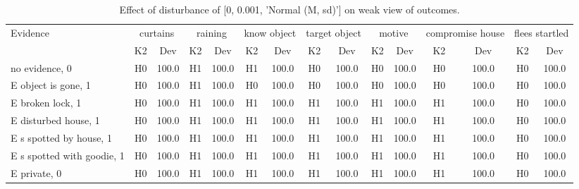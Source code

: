 \begin{table}\begin{tabular}{l|cc|cc|cc|cc|cc|cc|cc}\toprule\multirow{2}{*}{Evidence} & \multicolumn{2}{c}{curtains}& \multicolumn{2}{c}{raining}& \multicolumn{2}{c}{know object}& \multicolumn{2}{c}{target object}& \multicolumn{2}{c}{motive}& \multicolumn{2}{c}{compromise house}& \multicolumn{2}{c}{flees startled}\\& {K2} & {Dev}& {K2} & {Dev}& {K2} & {Dev}& {K2} & {Dev}& {K2} & {Dev}& {K2} & {Dev}& {K2} & {Dev}\\\midrule
no evidence, 0 & H0&100.0&H1&100.0&H1&100.0&H0&100.0&H0&100.0&H0&100.0&H0&100.0\\E object is gone, 1 & H0&100.0&H1&100.0&H0&100.0&H0&100.0&H0&100.0&H0&100.0&H0&100.0\\E broken lock, 1 & H0&100.0&H1&100.0&H1&100.0&H1&100.0&H1&100.0&H1&100.0&H0&100.0\\E disturbed house, 1 & H0&100.0&H1&100.0&H1&100.0&H1&100.0&H1&100.0&H1&100.0&H0&100.0\\E s spotted by house, 1 & H0&100.0&H1&100.0&H1&100.0&H1&100.0&H1&100.0&H1&100.0&H0&100.0\\E s spotted with goodie, 1 & H0&100.0&H1&100.0&H1&100.0&H1&100.0&H1&100.0&H1&100.0&H0&100.0\\E private, 0 & H0&100.0&H1&100.0&H1&100.0&H1&100.0&H1&100.0&H1&100.0&H0&100.0\\\bottomrule\end{tabular}\caption{Effect of disturbance of [0, 0.001, 'Normal (M, sd)'] on weak view of outcomes.}\end{table}